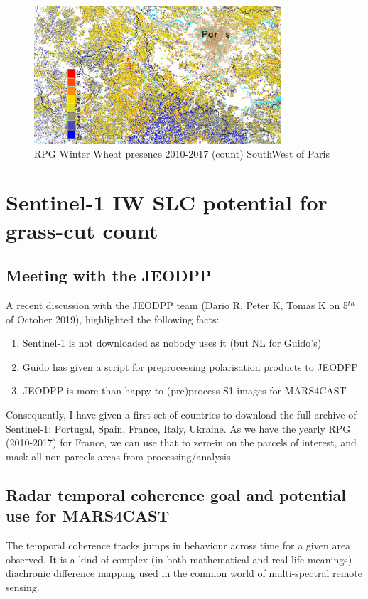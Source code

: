 \documentclass[a4paper,11.5pt,onecolumn]{article}
\begin{document}
\begin{figure}[htbp]
\begin{center}
\includegraphics[width=0.82\textwidth]{images/RPG_zoomed.png}
\end{center}
\caption{RPG Winter Wheat presence 2010-2017 (count) SouthWest of Paris}
\label{fig7}
\end{figure}

\newpage
\section{Sentinel-1 IW SLC potential for grass-cut count}
\subsection{Meeting with the JEODPP}
A recent discussion with the JEODPP team (Dario R, Peter K, Tomas K on 5$^{th}$ of October 2019), highlighted the following facts:

\begin{enumerate}
\item Sentinel-1 is not downloaded as nobody uses it (but NL for Guido's)
\item Guido has given a script for preprocessing polarisation products to JEODPP
\item JEODPP is more than happy to (pre)process S1 images for MARS4CAST  
\end{enumerate}

Consequently, I have given a first set of countries to download the full archive of Sentinel-1: Portugal, Spain, France, Italy, Ukraine. As we have the yearly RPG (2010-2017) for France, we can use that to zero-in on the parcels of interest, and mask all non-parcels areas from processing/analysis. 

\subsection{Radar temporal coherence goal and potential use for MARS4CAST}
The temporal coherence tracks jumps in behaviour across time for a given area observed. It is a kind of complex (in both mathematical and real life meanings) diachronic difference mapping used in the common world of multi-spectral remote sensing.
\end{document}
